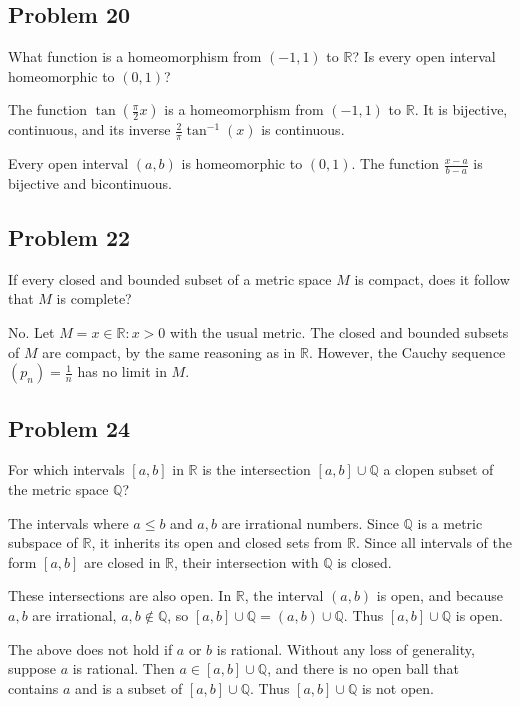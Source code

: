 \documentclass{article}
\begin{document}
\subsection*{Problem 20}

What function is a homeomorphism from $(-1, 1)$ to $\mathbb{R}$? Is every open interval homeomorphic to $(0, 1)$?

The function $\tan(\frac{\pi}{2}x)$ is a homeomorphism from $(-1, 1)$ to $\mathbb{R}$. It is bijective, continuous, and its inverse $\frac{2}{\pi}\tan^{-1}(x)$ is continuous.

Every open interval $(a, b)$ is homeomorphic to $(0, 1)$. The function $\frac{x-a}{b-a}$ is bijective and bicontinuous.

\subsection*{Problem 22}

If every closed and bounded subset of a metric space $M$ is compact, does it follow that $M$ is complete?

No. Let $M = {x\in \mathbb{R}: x > 0}$ with the usual metric. The closed and bounded subsets of $M$ are compact, by the same reasoning as in $\mathbb{R}$. However, the Cauchy sequence $(p_n) = \frac{1}{n}$ has no limit in $M$.

\subsection*{Problem 24}

For which intervals $[a, b]$ in $\mathbb{R}$ is the intersection $[a, b]\cup \mathbb{Q}$ a clopen subset of the metric space $\mathbb{Q}$?

The intervals where $a \leq b$ and $a, b$ are irrational numbers. Since $\mathbb{Q}$ is a metric subspace of $\mathbb{R}$, it inherits its open and closed sets from $\mathbb{R}$. Since all intervals of the form $[a, b]$ are closed in $\mathbb{R}$, their intersection with $\mathbb{Q}$ is closed.

These intersections are also open. In $\mathbb{R}$, the interval $(a, b)$ is open, and because $a, b$ are irrational, $a, b \notin \mathbb{Q}$, so $[a, b]\cup\mathbb{Q} = (a, b)\cup\mathbb{Q}$. Thus $[a, b]\cup\mathbb{Q}$ is open.

The above does not hold if $a$ or $b$ is rational. Without any loss of generality, suppose $a$ is rational. Then $a \in [a, b]\cup\mathbb{Q}$, and there is no open ball that contains $a$ and is a subset of  $[a, b]\cup\mathbb{Q}$. Thus $[a, b]\cup\mathbb{Q}$ is not open.
\end{document}
